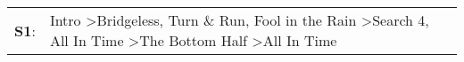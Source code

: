 \begin{supertabular}{p{0.03\textwidth}p{0.92\textwidth}}
 \textbf{S1}:  &  Intro\textsuperscript{} \textgreater \enspace Bridgeless\textsuperscript{}, \enspace Turn \& Run\textsuperscript{}, \enspace Fool in the Rain\textsuperscript{} \textgreater \enspace Search 4\textsuperscript{}, \enspace All In Time\textsuperscript{} \textgreater \enspace The Bottom Half\textsuperscript{} \textgreater \enspace All In Time\textsuperscript{}  \enspace  \\
\end{supertabular}
